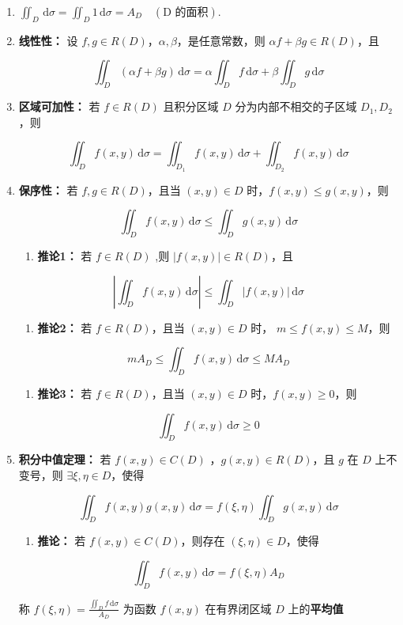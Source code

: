 \documentclass[lang = zh , final , oneside , openany , titlepage , zihao = -4 , linespread = 1.3 , baselineskip = false , cjk-font = windows , text-font = newtx , math-font = newtx , math-style = TeX]{sjtureport}
\begin{document}
\begin{enumerate}
\def\labelenumi{\arabic{enumi}.}
\item
  \(\displaystyle\iint_D\,\mathrm{d}\sigma = \iint_D 1\,\mathrm{d}\sigma = A_D \quad\left(\text{D 的面积}\right)\).
\item
  \textbf{线性性：} 设
  \(f,g\in R(D)\)，\(\alpha , \beta\)，是任意常数，则
  \(\alpha f +\beta g \in R(D)\)，且

  \[\iint_D (\alpha f +\beta g)\,\mathrm{d}\sigma = \alpha \iint_D f\,\mathrm{d}\sigma + \beta \iint_D g\,\mathrm{d}\sigma\]
\item
  \textbf{区域可加性：} 若 \(f\in R(D)\) 且积分区域 \(D\)
  分为内部不相交的子区域 \(D_1 , D_2\)，则

  \[\iint_D f(x,y) \,\mathrm{d}\sigma = \iint_{D_1} f(x,y)\,\mathrm{d}\sigma + \iint_{D_2} f(x,y)\,\mathrm{d}\sigma\]
\item
  \textbf{保序性：} 若 \(f,g\in R(D)\)，且当 \((x,y)\in D\)
  时，\(f(x,y)\leq g(x,y)\)，则

  \[\iint_D f(x,y)\,\mathrm{d}\sigma \leq \iint_D g(x,y)\,\mathrm{d}\sigma\]

  \begin{enumerate}
  \item
    \textbf{推论1：} 若 \(f\in R(D)\) ,则
    \(\vert f(x,y) \vert \in R(D)\)，且
  \end{enumerate}

  \[\left\vert \iint_D f(x,y)\,\mathrm{d}\sigma \right\vert \leq \iint_D \vert f(x,y) \vert \,\mathrm{d}\sigma\]

  \begin{enumerate}
  \item
    \textbf{推论2：} 若 \(f\in R(D)\)，且当 \((x,y)\in D\) 时，
    \(m\leq f(x,y) \leq M\)，则
  \end{enumerate}

  \[mA_D \leq \iint_D f(x,y)\,\mathrm{d}\sigma \leq MA_D\]

  \begin{enumerate}
  \item
    \textbf{推论3：} 若 \(f\in R(D)\)，且当 \((x,y)\in D\)
    时，\(f(x,y) \geq 0\)，则
  \end{enumerate}

  \[\iint_D f(x,y)\,\mathrm{d}\sigma \geq 0\]
\item
  \textbf{积分中值定理：} 若 \(f(x,y)\in C(D)\) ，\(g(x,y)\in R(D)\)，且
  \(g\) 在 \(D\) 上不变号，则 \(\exists \xi , \eta \in D\)，使得

  \[\iint_D f(x,y)g(x,y)\,\mathrm{d}\sigma = f(\xi ,\eta )\iint_D g(x,y)\,\mathrm{d}\sigma\]

  \begin{enumerate}
  \item
    \textbf{推论：} 若 \(f(x,y)\in C(D)\)，则存在
    \((\xi , \eta )\in D\)，使得
  \end{enumerate}

  \[\iint_D f(x,y)\,\mathrm{d}\sigma = f(\xi ,\eta )A_D\]

  称 \(f(\xi,\eta) = \frac{\iint_D f\,\mathrm{d}\sigma}{A_D}\) 为函数
  \(f(x,y)\) 在有界闭区域 \(D\) 上的\textbf{平均值}
\end{enumerate}
\end{document}
